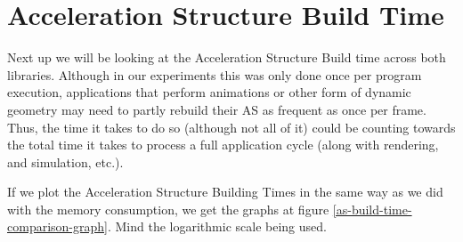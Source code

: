 \clearpage
\section{Acceleration Structure Build Time}
Next up we will be looking at the Acceleration Structure Build time across both libraries. Although in our experiments this was only done once per program execution, applications that perform animations or other form of dynamic geometry may need to partly rebuild their AS as frequent as once per frame. Thus, the time it takes to do so (although not all of it) could be counting towards the total time it takes to process a full application cycle (along with rendering, and simulation, etc.).

If we plot the Acceleration Structure Building Times in the same way as we did with the memory consumption, we get the graphs at figure \ref{as-build-time-comparison-graph}. Mind the logarithmic scale being used.

